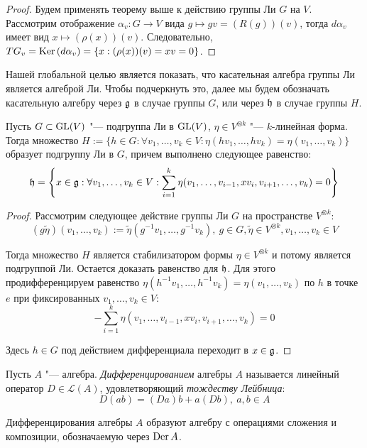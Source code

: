 \begin{proof}
	Будем применять теорему выше к действию группы Ли $G$ на $V$. Рассмотрим отображение $\alpha_v: G \to V$ вида $g \mapsto gv = (R(g))(v)$, тогда $d\alpha_v$ имеет вид $x \mapsto (\rho(x))(v)$. Следовательно, $TG_v = \operatorname{Ker}{(d\alpha_v)} = \{x : (\rho(x))(v) = xv = 0\}$.
\end{proof}

\begin{note}
	Нашей глобальной целью является показать, что касательная алгебра группы Ли является алгеброй Ли. Чтобы подчеркнуть это, далее мы будем обозначать касательную алгебру через $\mathfrak g$ в случае группы $G$, или через $\mathfrak h$ в случае группы $H$.
\end{note}

\begin{theorem}
	Пусть $G \subset \operatorname{GL}(V)$ "--- подгруппа Ли в $\operatorname{GL}(V)$, $\eta \in V^{\otimes k}$ "--- $k$-линейная форма. Тогда множество $H := \{h \in G: \forall v_1, \dotsc, v_k \in V: \eta(hv_1, \dotsc, hv_k) = \eta(v_1, \dotsc, v_k)\}$ образует подгруппу Ли в $G$, причем выполнено следующее равенство:
	\[\mathfrak h = \left\{x \in \mathfrak g: \forall v_1, \dotsc, v_k \in V: \sum_{i = 1}^k\eta(v_1, \dotsc, v_{i - 1}, x v_i, v_{i+1}, \dotsc, v_k) = 0\right\}\]
\end{theorem}

\begin{proof}
	Рассмотрим следующее действие группы Ли $G$ на пространстве $V^{\otimes k}$:
	\[(g\widetilde\eta)(v_1, \dotsc, v_k) := \widetilde\eta(g^{-1}v_1, \dotsc, g^{-1}v_k),~g \in G, \widetilde\eta \in V^{\otimes k}, v_1, \dotsc, v_k \in V\]
	
	Тогда множество $H$ является стабилизатором формы $\eta \in V^{\otimes k}$ и потому является подгруппой Ли. Остается доказать равенство для $\mathfrak h$. Для этого продифференцируем равенство $\eta(h^{-1}v_1, \dotsc, h^{-1}v_k) = \eta(v_1, \dotsc, v_k)$ по $h$ в точке $e$ при фиксированных $v_1, \dotsc, v_k \in V$:
	\[-\sum_{i = 1}^k\eta(v_1, \dotsc, v_{i - 1}, x v_i, v_{i+1}, \dotsc, v_k) = 0\]
	
	Здесь $h \in G$ под действием дифференциала переходит в $x \in \mathfrak g$.
\end{proof}

\begin{definition}
	Пусть $A$ "--- алгебра. \textit{Дифференцированием} алгебры $A$ называется линейный оператор $D \in \mathcal{L}(A)$, удовлетворяющий \textit{тождеству Лейбница}:
	\[D(ab) = (Da)b + a(Db),~a, b \in A\]
	
	Дифференцирования алгебры $A$ образуют алгебру с операциями сложения и композиции, обозначаемую через $\operatorname{Der}{A}$.
\end{definition}

